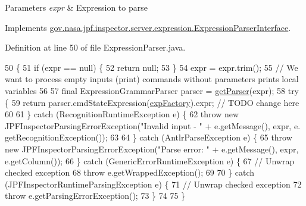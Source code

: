 \begin{DoxyParams}{Parameters}
{\em expr} & Expression to parse \\
\hline
\end{DoxyParams}


Implements \hyperlink{interfacegov_1_1nasa_1_1jpf_1_1inspector_1_1server_1_1expression_1_1_expression_parser_interface_adf1e661201d1a5686257122c604fc897}{gov.\+nasa.\+jpf.\+inspector.\+server.\+expression.\+Expression\+Parser\+Interface}.



Definition at line 50 of file Expression\+Parser.\+java.


\begin{DoxyCode}
50                                                                                                            
                                                     \{
51     \textcolor{keywordflow}{if} (expr == null) \{
52       \textcolor{keywordflow}{return} null;
53     \}
54     expr = expr.trim();
55     \textcolor{comment}{// We want to process empty inputs (print) commands without parameters prints local variables}
56 
57     \textcolor{keyword}{final} ExpressionGrammarParser parser = \hyperlink{classgov_1_1nasa_1_1jpf_1_1inspector_1_1server_1_1expression_1_1_expression_parser_aaef85bb6690c79fcbadd105acdf46e18}{getParser}(expr);
58     \textcolor{keywordflow}{try} \{
59       \textcolor{keywordflow}{return} parser.cmdStateExpression(\hyperlink{classgov_1_1nasa_1_1jpf_1_1inspector_1_1server_1_1expression_1_1_expression_parser_ac104f9da945e44fd45fb00c2dfb83706}{expFactory}).expr; \textcolor{comment}{// TODO change here}
60 
61     \} \textcolor{keywordflow}{catch} (RecognitionRuntimeException e) \{
62       \textcolor{keywordflow}{throw} \textcolor{keyword}{new} JPFInspectorParsingErrorException(\textcolor{stringliteral}{"Invalid input - "} + e.getMessage(), expr, e.
      getRecognitionException());
63 
64     \} \textcolor{keywordflow}{catch} (AntlrParseException e) \{
65       \textcolor{keywordflow}{throw} \textcolor{keyword}{new} JPFInspectorParsingErrorException(\textcolor{stringliteral}{"Parse error: "} + e.getMessage(), expr, e.getColumn());
66     \} \textcolor{keywordflow}{catch} (GenericErrorRuntimeException e) \{
67       \textcolor{comment}{// Unwrap checked exception}
68       \textcolor{keywordflow}{throw} e.getWrappedException();
69 
70     \} \textcolor{keywordflow}{catch} (JPFInspectorRuntimeParsingException e) \{
71       \textcolor{comment}{// Unwrap checked exception}
72       \textcolor{keywordflow}{throw} e.getParsingErrorException();
73     \}
74 
75   \}
\end{DoxyCode}
